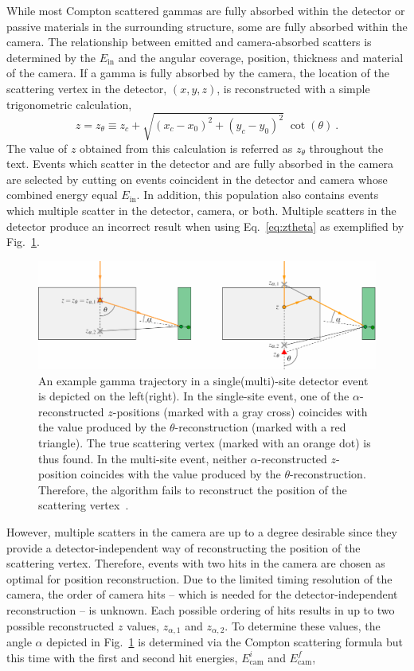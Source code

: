 While most Compton scattered gammas are fully absorbed within the detector or passive materials in the surrounding structure, some are fully absorbed within the camera. The relationship between emitted and camera-absorbed scatters is determined by the $E_\text{in}$ and the angular coverage, position, thickness and material of the camera. If a gamma is fully absorbed by the camera, the location of the scattering vertex in the detector, $(x,y,z)$, is reconstructed with a simple trigonometric calculation,
\begin{equation} \label{eq:ztheta}
    z = z_\theta \equiv z_c + \sqrt{(x_c-x_0)^2 + (y_c-y_0)^2} \;\cot(\theta)~. 
\end{equation}
The value of $z$ obtained from this calculation is referred as $z_\theta$ throughout the text. Events which scatter in the detector and are fully absorbed in the camera are selected by cutting on events coincident in the detector and camera whose combined energy equal $E_\text{in}$. In addition, this population also contains events which multiple scatter in the detector, camera, or both. Multiple scatters in the detector produce an incorrect result when using Eq.~\ref{eq:ztheta} as exemplified by Fig.~\ref{fig:cone_validation}. 
\begin{figure}[!tbh]
    \centering
    \includegraphics[width=6in]{figs/scanner/alpha_theta.pdf}
    \caption{An example gamma trajectory in a single(multi)-site detector event is depicted on the left(right). In the single-site event, one of the $\alpha$-reconstructed $z$-positions (marked with a gray cross) coincides with the value produced by the $\theta$-reconstruction (marked with a red triangle). The true scattering vertex (marked with an orange dot) is thus found. In the multi-site event, neither $\alpha$-reconstructed $z$-position coincides with the value produced by the $\theta$-reconstruction. Therefore, the algorithm fails to reconstruct the position of the scattering vertex~\cite{compton_scanner}.}
    \label{fig:cone_validation}
\end{figure}
However, multiple scatters in the camera are up to a degree desirable since they provide a detector-independent way of reconstructing the position of the scattering vertex. Therefore, events with two hits in the camera are chosen as optimal for position reconstruction. Due to the limited timing resolution of the camera, the order of camera hits -- which is needed for the detector-independent reconstruction -- is unknown. Each possible ordering of hits results in up to two possible reconstructed $z$ values, $z_{\alpha,1}$ and $z_{\alpha,2}$. To determine these values, the angle $\alpha$ depicted in Fig.~\ref{fig:cone_validation} is determined via the Compton scattering formula but this time with the first and second hit energies, $E_\text{cam}^i$ and $E_\text{cam}^f$, 
